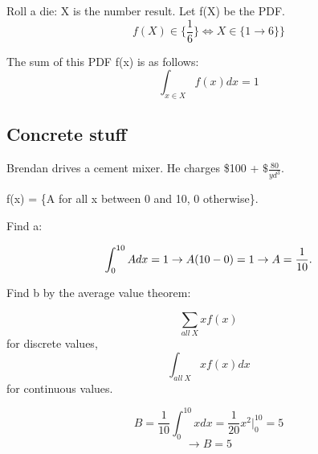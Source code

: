 \documentclass[]{article}
\begin{document}
		Roll a die: X is the number result. Let f(X) be the PDF. $$f(X) \in \{\dfrac{1}{6}\}\iff X\in\{1\to 6\}\}$$
		
		The sum of this PDF f(x) is as follows:
		\[\int_{x\in X}^{}f(x)dx = 1\]
		
		\subsection{Concrete stuff}
			Brendan drives a cement mixer. He charges \$100 + $\$\frac{80}{yd^3}$.
			
			f(x) = \{A for all x between 0 and 10, 0 otherwise\}.
			
			Find a:
			
			$$\int_0^{10}Adx = 1 \\
			\to A(10 - 0) = 1 \\
			\to A = \frac{1}{10}.$$
			
			Find b by the average value theorem:
			
			$$\sum_{all\ X}xf(x)$$ for discrete values,
			$$\int_{all\ X}xf(x)dx$$ for continuous values.
			
			$$ B = \frac{1}{10}\int_{0}^{10}xdx = \frac{1}{20}x^2|^{10}_{0} = 5$$
			$$\to B = 5$$
	
\end{document}
